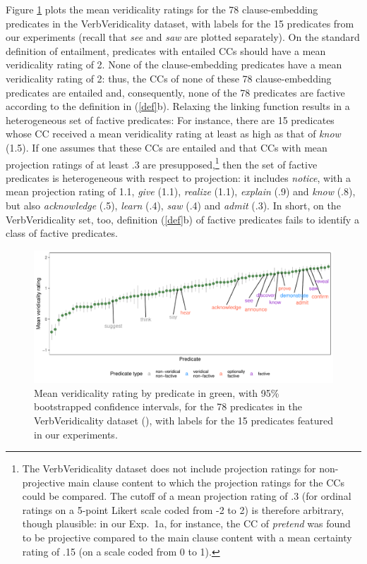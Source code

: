 \documentclass[11pt,fleqn]{article}
\newcommand{\6}{\mbox{$[\hspace*{-.6mm}[$}}
\newcommand{\9}{\mbox{$]\hspace*{-.6mm}]$}}
\begin{document}
Figure \ref{f-vv-projectivity} plots the mean veridicality ratings for the 78 clause-embedding predicates in the VerbVeridicality dataset, with labels for the 15 predicates from our experiments (recall that {\em see} and {\em saw} are plotted separately). On the standard definition of entailment, predicates with entailed CCs should have a mean veridicality rating of 2. None of the clause-embedding predicates have a mean veridicality rating of 2: thus, the CCs of none of these 78 clause-embedding predicates are entailed and, consequently, none of the 78 predicates are factive according to the definition in (\ref{def}b). Relaxing the linking function results in a heterogeneous set of factive predicates: For instance, there are 15 predicates whose CC received a mean veridicality rating at least as high as that of {\em know} (1.5). If one assumes that these CCs are entailed and that CCs with mean projection ratings of at least .3 are presupposed,\footnote{The VerbVeridicality dataset does not include projection ratings for non-projective main clause content to which the projection ratings for the CCs could be compared. The cutoff of a mean projection rating of .3 (for ordinal ratings on a 5-point Likert scale coded from -2 to 2) is therefore arbitrary, though plausible: in our Exp.~1a, for instance, the CC of {\em pretend} was found to be projective compared to the main clause content with a mean certainty rating of .15 (on a scale coded from 0 to 1).} then the set of factive predicates is heterogeneous with respect to projection: it includes {\em notice}, with a mean projection rating of 1.1, {\em give} (1.1), {\em realize} (1.1), {\em explain} (.9) and {\em know} (.8), but also {\em acknowledge} (.5), {\em learn} (.4), {\em saw} (.4) and {\em admit} (.3). In short, on the VerbVeridicality set, too, definition (\ref{def}b) of factive predicates fails to identify a class of factive predicates.

\begin{figure}[H]
\centering
\includegraphics[width=.77\paperwidth]{../../VerbVeridicality-analysis/graphs/means-entailment-by-predicate}

\caption{Mean veridicality rating by predicate in green, with 95\% bootstrapped confidence intervals, for the 78 predicates in the VerbVeridicality dataset (\citealt{ross-pavlick2019}), with labels for the 15 predicates featured in our experiments.}
\label{f-vv-projectivity}
\end{figure}
\end{document}
